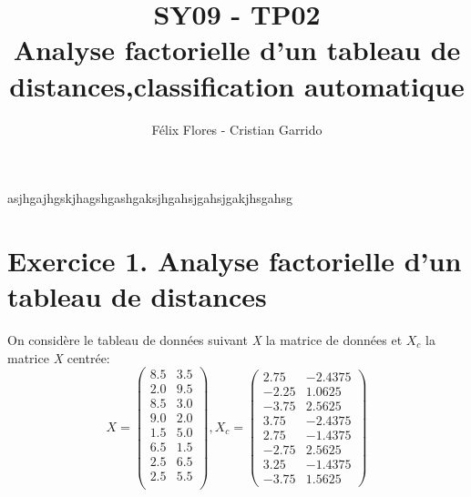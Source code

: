 \documentclass[a4paper,11pt]{article}
\title{SY09 - TP02\\Analyse factorielle d’un tableau de distances,classification automatique}
\author{Félix Flores - Cristian Garrido}
\begin{document}
\maketitle

asjhgajhgskjhagshgashgaksjhgahsjgahsjgakjhsgahsg

\section{Exercice 1. Analyse factorielle d’un tableau de distances}
On considère le tableau de données suivant \textit{X} la matrice de données et $X_{c}$ la matrice \textit{X} centrée:
\[X = \begin{pmatrix}
8.5 & 3.5 \\
2.0 & 9.5 \\
8.5 & 3.0 \\
9.0 & 2.0 \\
1.5 & 5.0 \\
6.5 & 1.5 \\
2.5 & 6.5 \\
2.5 & 5.5 \\
\end{pmatrix},
X_{c} = \begin{pmatrix}
2.75 & -2.4375\\
-2.25 & 1.0625\\
-3.75 & 2.5625\\
3.75 & -2.4375\\
2.75 & -1.4375\\
-2.75 & 2.5625\\
3.25 & -1.4375\\
-3.75 & 1.5625
 \end{pmatrix}\]
\\
\end{document}
